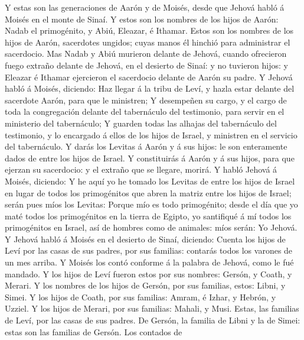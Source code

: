 Y estas son las generaciones de Aarón y de Moisés, desde
que Jehová habló á Moisés en el monte de Sinaí.  Y estos
son los nombres de los hijos de Aarón: Nadab el primogénito, y Abiú,
Eleazar, é Ithamar.  Estos son los nombres de los hijos de
Aarón, sacerdotes ungidos; cuyas manos él hinchió para administrar el
sacerdocio.  Mas Nadab y Abiú murieron delante de Jehová,
cuando ofrecieron fuego extraño delante de Jehová, en el desierto de
Sinaí: y no tuvieron hijos: y Eleazar é Ithamar ejercieron el sacerdocio
delante de Aarón su padre.  Y Jehová habló á Moisés,
diciendo:  Haz llegar á la tribu de Leví, y hazla estar
delante del sacerdote Aarón, para que le ministren;  Y
desempeñen su cargo, y el cargo de toda la congregación delante del
tabernáculo del testimonio, para servir en el ministerio del
tabernáculo;  Y guarden todas las alhajas del tabernáculo
del testimonio, y lo encargado á ellos de los hijos de Israel, y
ministren en el servicio del tabernáculo.  Y darás los
Levitas á Aarón y á sus hijos: le son enteramente dados de entre los
hijos de Israel.  Y constituirás á Aarón y á sus hijos,
para que ejerzan su sacerdocio: y el extraño que se llegare, morirá.
 Y habló Jehová á Moisés, diciendo:  Y he
aquí yo he tomado los Levitas de entre los hijos de Israel en lugar de
todos los primogénitos que abren la matriz entre los hijos de Israel;
serán pues míos los Levitas:  Porque mío es todo
primogénito; desde el día que yo maté todos los primogénitos en la
tierra de Egipto, yo santifiqué á mí todos los primogénitos en Israel,
así de hombres como de animales: míos serán: Yo Jehová. 
Y Jehová habló á Moisés en el desierto de Sinaí, diciendo:
 Cuenta los hijos de Leví por las casas de sus padres,
por sus familias: contarás todos los varones de un mes arriba.
 Y Moisés los contó conforme á la palabra de Jehová, como
le fué mandado.  Y los hijos de Leví fueron estos por sus
nombres: Gersón, y Coath, y Merari.  Y los nombres de los
hijos de Gersón, por sus familias, estos: Libni, y Simei.
 Y los hijos de Coath, por sus familias: Amram, é Izhar,
y Hebrón, y Uzziel.  Y los hijos de Merari, por sus
familias: Mahali, y Musi. Estas, las familias de Leví, por las casas de
sus padres.  De Gersón, la familia de Libni y la de
Simei: estas son las familias de Gersón.  Los contados de
